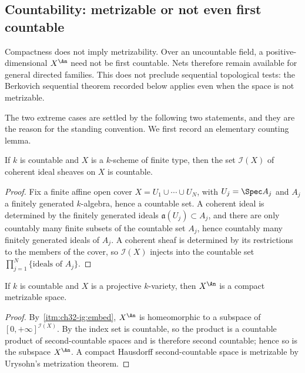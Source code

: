 \subsection{Countability: metrizable or not even first countable}
\label{sec:ch32-countability}

Compactness does not imply metrizability.  Over an uncountable field,
a positive-dimensional $X^{\An}$ need not be first countable.  Nets
therefore remain available for general directed families.  This does not
preclude sequential topological tests: the Berkovich sequential theorem
recorded below applies even when the space is not metrizable.

The two extreme cases are settled by the following two statements, and they
are the reason for the standing convention.  We first record an elementary
counting lemma.

\begin{lemma}
\label{lem:ch32-countably-many-ideals}
If $k$ is countable and $X$ is a $k$-scheme of finite type, then the
set $\mathcal I(X)$ of coherent ideal sheaves on $X$ is countable.
\end{lemma}

\begin{proof}
Fix a finite affine open cover $X=U_1\cup\cdots\cup U_N$, with
$U_j=\Spec A_j$ and $A_j$ a finitely generated $k$-algebra, hence a
countable set.  A coherent ideal is determined by the finitely generated
ideals $\mathfrak a(U_j)\subset A_j$, and there are only countably many
finite subsets of the countable set $A_j$, hence countably many finitely
generated ideals of $A_j$.  A coherent sheaf is determined by its
restrictions to the members of the cover, so $\mathcal I(X)$ injects into
the countable set $\prod_{j=1}^N\{\text{ideals of }A_j\}$.
\end{proof}

\begin{proposition}
\label{prop:ch32-metrizable}
If $k$ is countable and $X$ is a projective $k$-variety, then
$X^{\An}$ is a compact metrizable space.
\end{proposition}

\begin{proof}
By \,\cref{itm:ch32-ig:embed}, $X^{\An}$ is
homeomorphic to a subspace of $[0,+\infty]^{\mathcal I(X)}$.  By
 the index set is countable, so the
product is a countable product of second-countable spaces and is therefore
second countable; hence so is the subspace $X^{\An}$.  A compact Hausdorff
second-countable space is metrizable by Urysohn's metrization theorem.
\end{proof}

